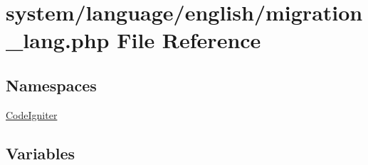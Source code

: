 \hypertarget{migration__lang_8php}{}\section{system/language/english/migration\+\_\+lang.php File Reference}
\label{migration__lang_8php}
\subsection*{Namespaces}
\begin{DoxyCompactItemize}
\item 
 \mbox{\hyperlink{namespace_code_igniter}{Code\+Igniter}}
\end{DoxyCompactItemize}
\subsection*{Variables}
